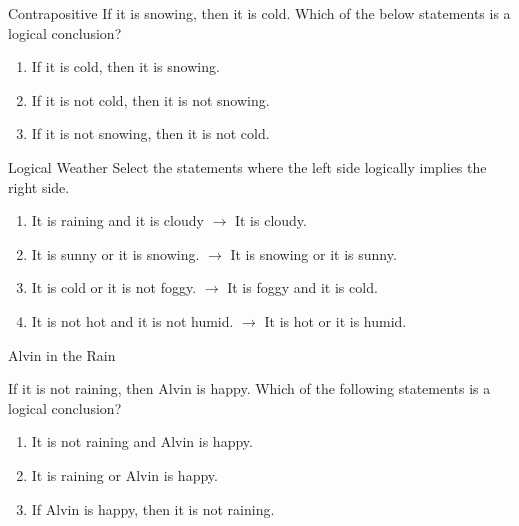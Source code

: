 \documentclass[a4paper,10pt]{report}
\begin{document}
\begin{problem}{Contrapositive}
If it is snowing, then it is cold. Which of the below statements is a logical
conclusion?

\begin{enumerate}[\hspace{.5cm}a.]
\item If it is cold, then it is snowing.
\item If it is not cold, then it is not snowing.
\item If it is not snowing, then it is not cold.
\end{enumerate}
\end{problem}

\begin{problem}{Logical Weather}
Select the statements where the left side logically implies the right side.

\begin{enumerate}[\hspace{.5cm}a.]
\item It is raining and it is cloudy $\to$ It is cloudy.
\item It is sunny or it is snowing. $\to$ It is snowing or it is sunny.
\item It is cold or it is not foggy. $\to$ It is foggy and it is cold.
\item It is not hot and it is not humid. $\to$ It is hot or it is humid.
\end{enumerate}
\end{problem}

\begin{problem}{Alvin in the Rain}

 If it is not raining, then Alvin is happy. Which of the following statements is
 a logical conclusion?

 \begin{enumerate}[\hspace{.5cm}a.]
  \item It is not raining and Alvin is happy.
  \item It is raining or Alvin is happy.
  \item If Alvin is happy, then it is not raining.
 \end{enumerate}
\end{problem}
\end{document}
